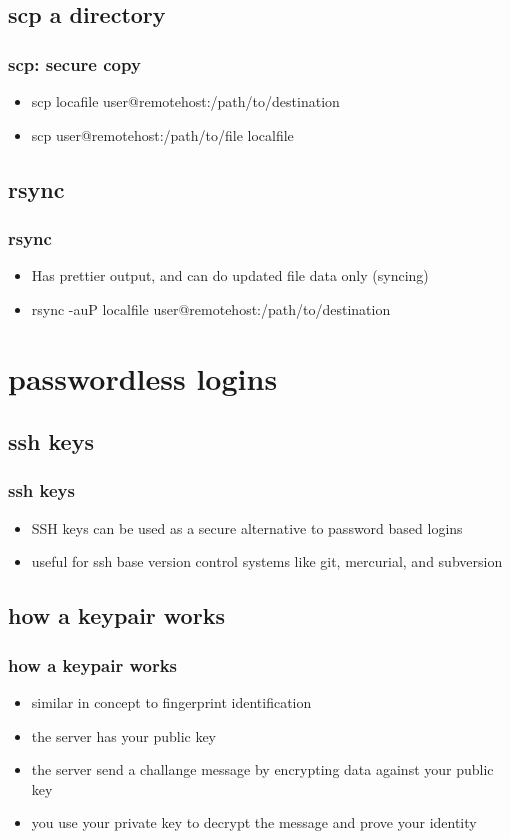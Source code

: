 \documentclass[hyperref={pdfpagelabels=false}]{beamer}
\begin{document}
\subsection{scp a directory}
\frame
{
    \frametitle{scp: secure copy}
    \begin{itemize}
    \item{scp locafile user@remotehost:/path/to/destination}
    \item{scp user@remotehost:/path/to/file localfile}
    \end{itemize}
}
\subsection{rsync}
\frame
{
    \frametitle{rsync}
    \begin{itemize}
    \item{Has prettier output, and can do updated file data only (syncing)}
    \item{rsync -auP localfile user@remotehost:/path/to/destination}
    \end{itemize}
}
\section{passwordless logins}
\subsection{ssh keys}
\frame
{
    \frametitle{ssh keys}
    \begin{itemize}
    \item{SSH keys can be used as a secure alternative to password based logins}
    \item{useful for ssh base version control systems like git, mercurial, and subversion}
    \end{itemize}
}
\subsection{how a keypair works}
\frame
{
    \frametitle{how a keypair works}
    \begin{itemize}
    \item{similar in concept to fingerprint identification}
    \item{the server has your public key}
    \item{the server send a challange message by encrypting data against your public key}
    \item{you use your private key to decrypt the message and prove your identity}
    \end{itemize}
}
\end{document}
